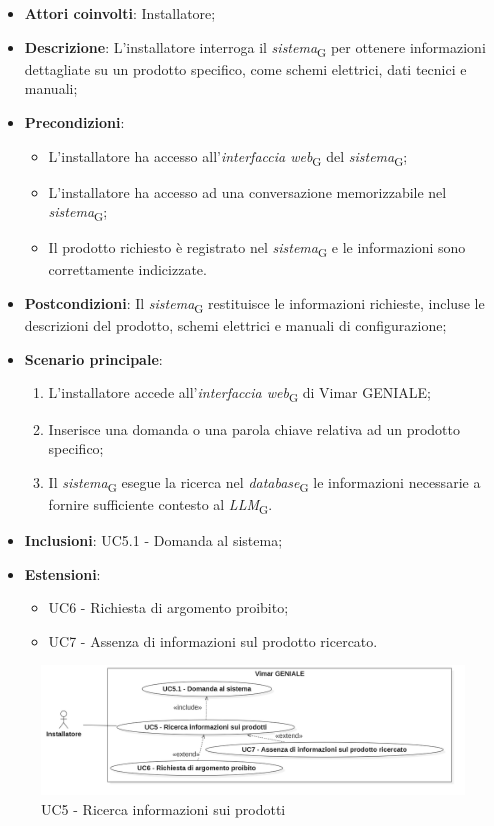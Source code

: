 \begin{itemize}
    \item \textbf{Attori coinvolti}: Installatore;
    \item \textbf{Descrizione}: L’installatore interroga il \textit{sistema}\textsubscript{G} per ottenere informazioni dettagliate su un prodotto specifico, come schemi elettrici, dati tecnici e manuali;
    \item \textbf{Precondizioni}: 
    \begin{itemize}
        \item L’installatore ha accesso all’\textit{interfaccia web}\textsubscript{G} del \textit{sistema}\textsubscript{G};
        \item L’installatore ha accesso ad una conversazione memorizzabile nel \textit{sistema}\textsubscript{G};
        \item Il prodotto richiesto è registrato nel \textit{sistema}\textsubscript{G} e le informazioni sono correttamente indicizzate.
    \end{itemize}
    \item \textbf{Postcondizioni}: Il \textit{sistema}\textsubscript{G} restituisce le informazioni richieste, incluse le descrizioni del prodotto, schemi elettrici e manuali di configurazione;
    \item \textbf{Scenario principale}:
    \begin{enumerate}
        \item L’installatore accede all’\textit{interfaccia web}\textsubscript{G} di Vimar GENIALE;
        \item Inserisce una domanda o una parola chiave relativa ad un prodotto specifico;
        \item Il \textit{sistema}\textsubscript{G} esegue la ricerca nel \textit{database}\textsubscript{G} le informazioni necessarie a fornire sufficiente contesto al \textit{LLM}\textsubscript{G}.
    \end{enumerate}
    \item \textbf{Inclusioni}: UC5.1 - Domanda al sistema;
    \item \textbf{Estensioni}: 
    \begin{itemize}
        \item UC6 - Richiesta di argomento proibito;
        \item UC7 - Assenza di informazioni sul prodotto ricercato.
    \end{itemize}
\end{itemize}
\begin{figure}[H]
\centering
\includegraphics[width=1\textwidth]{contents/casi_duso/png/UC5.png}
\caption{UC5 - Ricerca informazioni sui prodotti}
\end{figure}

